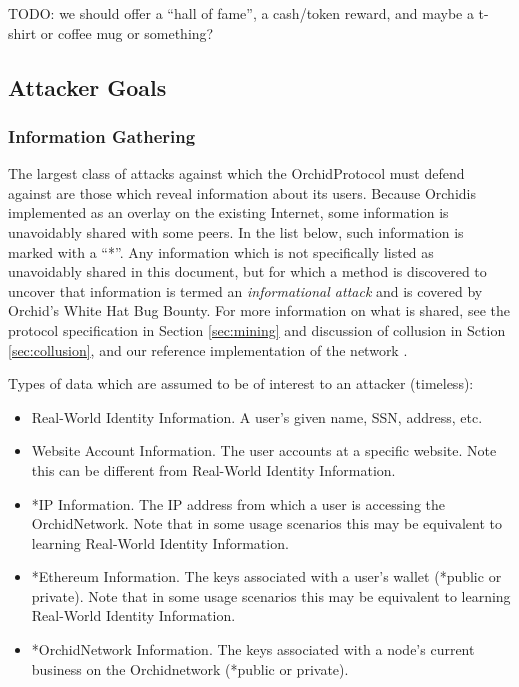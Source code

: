 \documentclass{article}
\newcommand{\orchid}{Orchid}
\newcommand{\Orchid}{\orchid}
\begin{document}
TODO: we should offer a “hall of fame”, a cash/token reward, and maybe a t-shirt or coffee mug or something?


\subsection{Attacker Goals}

\subsubsection{Information Gathering}

The largest class of attacks against which the \Orchid Protocol must defend against are those which reveal information about its users. Because \Orchid is implemented as an overlay on the existing Internet, some information is unavoidably shared with some peers. In the list below, such information is marked with a “*”. Any information which is not specifically listed as unavoidably shared in this document, but for which a method is discovered to uncover that information is termed an \emph{informational attack} and is covered by \Orchid’s White Hat Bug Bounty. For more information on what is shared, see the protocol specification in Section \ref{sec:mining} and discussion of collusion in Sction \ref{sec:collusion}, and our reference implementation of the network .

Types of data which are assumed to be of interest to an attacker (timeless):

\begin{itemize}
\item Real-World Identity Information. A user’s given name, SSN, address, etc.
\item Website Account Information. The user accounts at a specific website. Note this can be different from Real-World Identity Information.
\item *IP Information. The IP address from which a user is accessing the \Orchid Network. Note that in some usage scenarios this may be equivalent to learning Real-World Identity Information.
\item *Ethereum Information. The keys associated with a user’s wallet (*public or private). Note that in some usage scenarios this may be equivalent to learning Real-World Identity Information.
\item *\Orchid Network Information. The keys associated with a node’s current business on the \Orchid network (*public or private).
\end{itemize}
\end{document}
